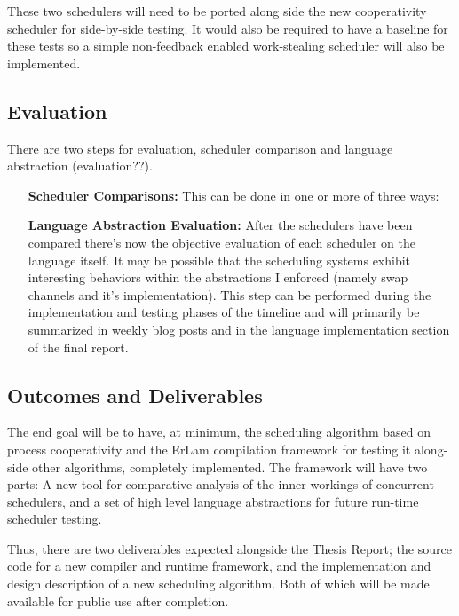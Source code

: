 These two schedulers will need to be ported along side the new cooperativity scheduler for side-by-side testing. It
would also be required to have a baseline for these tests so a simple non-feedback enabled work-stealing scheduler
will also be implemented.

\subsection{Evaluation}
\label{sec:workevaluation}

There are two steps for evaluation, scheduler comparison and language abstraction (evaluation??).

\begin{itemize}
\item[{\bf Scheduler Comparisons:}] This can be done in one or more of three ways: %

\item[{\bf Language Abstraction Evaluation:}] After the schedulers have been compared there's now the objective
	evaluation of each scheduler on the language itself. It may be possible that the scheduling systems
	exhibit interesting behaviors within the abstractions I enforced (namely swap channels and it's 
	implementation). This step can be performed during the implementation and testing phases of the 
	timeline and will primarily be summarized in weekly blog posts and in the language implementation
	section of the final report.

\end{itemize}

\subsection{Outcomes and Deliverables}
\label{sec:outcomes}

The end goal will be to have, at minimum, the scheduling algorithm based on process cooperativity and 
the ErLam compilation framework for testing it along-side other algorithms, completely implemented. The 
framework will have two parts: A new tool for comparative analysis of the inner workings of concurrent 
schedulers, and a set of high level language abstractions for future run-time scheduler testing.

Thus, there are two deliverables expected alongside the Thesis Report; the source code for a new compiler 
and runtime framework, and the implementation and design description of a new scheduling algorithm. Both
of which will be made available for public use after completion.

